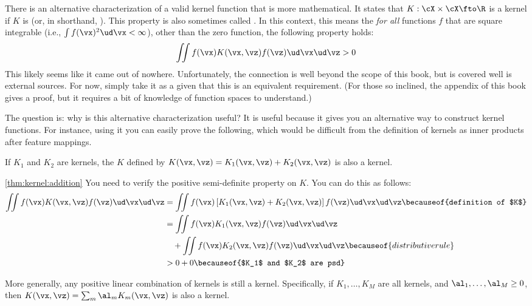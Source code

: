 There is an alternative characterization of a valid kernel function
that is more mathematical.  It states that $K : \cX \times \cX \fto
\R$ is a kernel if $K$ is  (or, in
shorthand, ).  This property is also sometimes called
.  In this context, this means the
\emph{for all} functions $f$ that are square integrable (i.e., $\int
f(\vx)^2 \ud\vx < \infty$), other than the zero function, the
following property holds:
%
\begin{align}
\int\!\!\!\int f(\vx) K(\vx,\vz) f(\vz) \ud \vx \ud \vz > 0
\end{align}
%
This likely seems like it came out of nowhere.  Unfortunately, the
connection is well beyond the scope of this book, but is covered well
is external sources.  For now, simply take it as a given that this is
an equivalent requirement.  (For those so inclined, the appendix of
this book gives a proof, but it requires a bit of knowledge of
function spaces to understand.)

The question is: why is this alternative characterization useful?  It
is useful because it gives you an alternative way to construct kernel
functions.  For instance, using it you can easily prove the following,
which would be difficult from the definition of kernels as inner
products after feature mappings.
%
\begin{theorem} \label{thm:kernel:addition}
  If $K_1$ and $K_2$ are kernels, the $K$ defined by $K(\vx,\vz) =
  K_1(\vx,\vz) + K_2(\vx,\vz)$ is also a kernel.
\end{theorem}
\begin{myproof}{\ref{thm:kernel:addition}}
You need to verify the positive semi-definite property on $K$.  You
can do this as follows:
%
\begin{align}
\int\!\!\!\int f(\vx) K(\vx,\vz) f(\vz) \ud \vx \ud \vz
&= \int\!\!\!\int f(\vx) \left[ K_1(\vx,\vz) + K_2(\vx,\vz) \right] f(\vz) \ud \vx \ud \vz
   \becauseof{definition of $K$}\\
&= \int\!\!\!\int f(\vx) K_1(\vx,\vz) f(\vz) \ud \vx \ud \vz \nonumber\\
&\quad + \int\!\!\!\int f(\vx) K_2(\vx,\vz) f(\vz) \ud \vx \ud \vz
  \becauseof{distributive rule}\\
&> 0 + 0
   \becauseof{$K_1$ and $K_2$ are psd}
\end{align}
\end{myproof}

More generally, any positive linear combination of kernels is still a
kernel.  Specifically, if $K_1, \dots, K_M$ are all kernels, and
$\al_1, \dots, \al_M \geq 0$, then $K(\vx,\vz) = \sum_m \al_m
K_m(\vx,\vz)$ is also a kernel.

